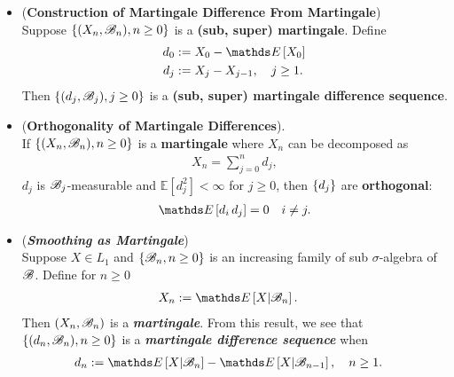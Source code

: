 \documentclass[11pt]{article}
\begin{document}
\begin{itemize}
\item \begin{proposition} (\textbf{Construction of Martingale Difference From Martingale}) \citep{resnick2013probability}\\
Suppose $\left\{(X_n, {\mathscr B}_n), n \ge 0\right\}$ is a \textbf{(sub, super) martingale}. Define
\begin{align*}
d_0&:= X_0 - \E{}{X_0}\\
d_j &:= X_j - X_{j-1}, \quad j\ge 1.
\end{align*}
Then $\left\{(d_j, {\mathscr B}_j), j \ge 0\right\}$ is a \textbf{(sub, super) martingale difference sequence}.
\end{proposition}

\item \begin{proposition} (\textbf{Orthogonality of Martingale Differences}). \citep{resnick2013probability}\\
If $\left\{(X_n, {\mathscr B}_n), n \ge 0\right\}$ is a \textbf{martingale} where $X_n$ can be decomposed as
\begin{align*}
X_n = \sum_{j=0}^{n} d_j, 
\end{align*}  $d_j$ is ${\mathscr B}_j$-measurable and  $\mathds{E}[d_j^2] < \infty$ for $j \ge 0$, then $\left\{d_j\right\}$ are \textbf{orthogonal}:
\begin{align*}
\E{}{d_i\,d_j} = 0 \quad i \neq j.
\end{align*}
\end{proposition}

\item \begin{example} (\textbf{\emph{Smoothing as Martingale}})\\
Suppose $X \in L_1$ and $\left\{{\mathscr B}_n, n \ge 0\right\}$ is an increasing family of sub $\sigma$-algebra of ${\mathscr B}$. Define for $n \ge 0$
\begin{align*}
X_n &:= \E{}{X | \srB_n}.
\end{align*}
Then $(X_n, {\mathscr B}_n)$ is a \emph{\textbf{martingale}}. From this result, we see that $\left\{(d_n, {\mathscr B}_n), n \ge 0\right\}$ is a \emph{\textbf{martingale difference sequence}} when 
\begin{align}
d_n &:= \E{}{X | \srB_n} - \E{}{X | \srB_{n-1}}, \quad n\ge 1. \label{eqn: smoothing_martingale_difference}
\end{align}
\end{example}


\end{itemize}
\end{document}
